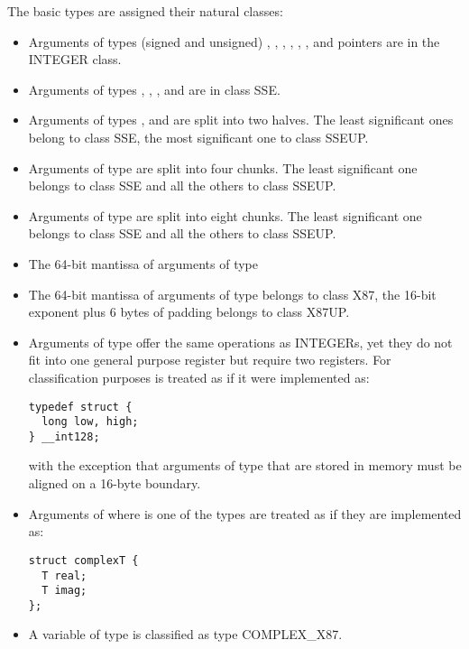 The basic types are assigned their natural classes:
\begin{itemize}
\item Arguments of types (signed and unsigned) , ,
  , , , , and
  pointers are in the INTEGER class.
\item Arguments of types , , ,
   and  are in class SSE.
\item Arguments of types , 
  and  are split into two halves.  The least significant
  ones belong to class SSE, the most significant one to class SSEUP.
\item Arguments of type  are split into four \eightbyte
  chunks.  The least significant one belongs to class SSE and all the
  others to class SSEUP.
\item Arguments of type  are split into eight \eightbyte
  chunks.  The least significant one belongs to class SSE and all the
  others to class SSEUP.
\item The 64-bit mantissa of arguments of type 
\item The 64-bit mantissa of arguments of type 
  belongs to class X87, the 16-bit exponent plus 6 bytes of padding
  belongs to class X87UP.
\item Arguments of type  offer the same operations as
INTEGERs, yet they do not fit into one general purpose register but
require two registers.  For
classification purposes  is treated as if it
were implemented as:
\begin{verbatim}
typedef struct {
  long low, high;
} __int128;
\end{verbatim}
with the exception that arguments of type  that are
stored in memory must be aligned on a 16-byte boundary.

\item Arguments of  where  is one of the types
   are treated as if they are
  implemented as:
\begin{verbatim}
struct complexT {
  T real;
  T imag;
};
\end{verbatim}
\item A variable of type  is classified as
  type COMPLEX\_X87.
\end{itemize}


